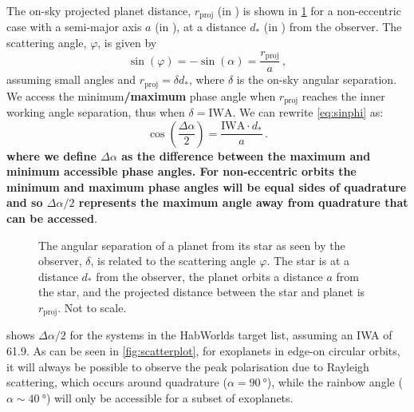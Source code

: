 \documentclass[usenatbib]{mnras}
\newcommand{\HWO}{HabWorlds\xspace}
\begin{document}
%
The on-sky projected planet distance, $r_\mathrm{proj}$ (in \unit{\au}) is shown in \cref{fig:scattering-angle} for a non-eccentric case with a semi-major axis $a$ (in \unit{\au}), at a distance $d_*$ (in \unit{\parsec}) from the observer.
%
The scattering angle, $\varphi$, is given by
\begin{equation}
    \label{eq:sinphi}
    \sin(\varphi) = - \sin(\alpha) = \frac{r_\mathrm{proj}}{a} \,,
\end{equation}
assuming small angles and $r_\mathrm{proj} = \delta d_*$, where $\delta$ is the on-sky angular separation.
%
We access the minimum{\bf /maximum} phase angle when $r_\mathrm{proj}$ reaches the inner working angle separation, thus when $\delta = \mathrm{IWA}$. 
%
We can rewrite \cref{eq:sinphi} as:
\begin{equation}
    \label{eq:scattering_angle}
    \cos\left(\dfrac{\Delta \alpha}{2}\right) = \frac{\mathrm{IWA} 
    \cdot d_*}{a} \,.
\end{equation}
{\bf where we define $\Delta \alpha$ as the difference between the maximum and 
minimum accessible phase angles. For non-eccentric orbits the minimum and maximum phase angles will be equal sides of quadrature and so $\Delta \alpha / 2$ represents the maximum angle away from quadrature that can be accessed}.

\begin{figure}
    \centering
    
    \caption{
        The angular separation of a planet from its star as seen by the observer, $\delta$, is related to the scattering angle $\varphi$. 
        The star is at a distance $d_*$ from the observer, the planet orbits a distance $a$ from the star, and  the projected distance between the star and planet is  $r_\mathrm{proj}$. 
        Not to scale. 
    }
    \label{fig:scattering-angle}
\end{figure}

 shows {\bf $\Delta \alpha / 2$} for the systems in the \HWO target list, assuming an IWA of \qty{61.9}{\mas}.
%
As can be seen in \cref{fig:scatterplot}, for exoplanets in edge-on circular orbits, it will always be possible to observe the peak polarisation due to Rayleigh scattering, which occurs around quadrature ($\alpha=\qty{90}{\degree}$), while the rainbow angle ($\alpha\sim\qty{40}{\degree}$) will only be accessible for a subset of exoplanets.
\end{document}

